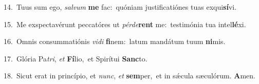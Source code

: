 {\numbfont\textcolor{\numbcolor}{14.}}~Tuus sum ego, \textit{sal}\-\textit{vum} \textbf{me} fac:~\star quóniam justificatiónes tuas exqui\-\textbf{sí}\-vi.\par
{\numbfont\textcolor{\numbcolor}{15.}}~Me exspectavérunt peccatóres ut \textit{pér}\-\textit{de}\textbf{rent} me:~\star testimónia tua intel\-\textbf{lé}\-xi.\par
{\numbfont\textcolor{\numbcolor}{16.}}~Omnis consummatiónis \textit{vi}\-\textit{di} \textbf{fi}\-nem:~\star latum mandátum tuum \textbf{ni}\-mis.\par
{\numbfont\textcolor{\numbcolor}{17.}}~Glória Pa\-\textit{tri}\-, \textit{et} \textbf{Fí}\-lio,~\star et Spirítui \textbf{Sanc}\-to.\par
{\numbfont\textcolor{\numbcolor}{18.}}~Sicut erat in princípio, et \textit{nunc}\-, \textit{et} \textbf{sem}\-per,~\star et in sǽcula sæculórum. \textbf{A}\-men.\par
